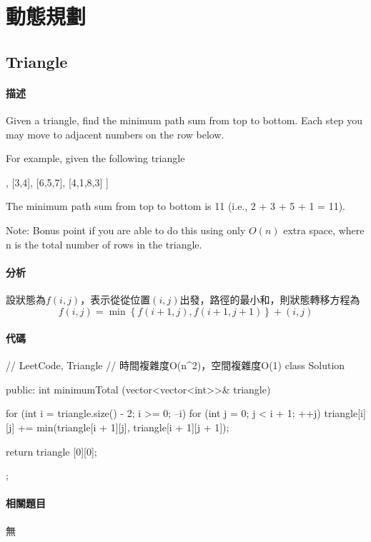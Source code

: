 \chapter{動態規劃}


\section{Triangle} %
\label{sec:triangle}


\subsubsection{描述}
Given a triangle, find the minimum path sum from top to bottom. Each step you may move to adjacent numbers on the row below.

For example, given the following triangle
\begin{Code}
[
     [2],
    [3,4],
   [6,5,7],
  [4,1,8,3]
]
\end{Code}
The minimum path sum from top to bottom is 11 (i.e., 2 + 3 + 5 + 1 = 11).

Note: Bonus point if you are able to do this using only $O(n)$ extra space, where n is the total number of rows in the triangle.


\subsubsection{分析}
設狀態為$f(i, j)$，表示從從位置$(i,j)$出發，路徑的最小和，則狀態轉移方程為
$$
f(i,j)=\min\left\{f(i+1,j),f(i+1,j+1)\right\}+(i,j)
$$


\subsubsection{代碼}
\begin{Code}
// LeetCode, Triangle
// 時間複雜度O(n^2)，空間複雜度O(1)
class Solution {
public:
    int minimumTotal (vector<vector<int>>& triangle) {
        for (int i = triangle.size() - 2; i >= 0; --i)
            for (int j = 0; j < i + 1; ++j)
                triangle[i][j] += min(triangle[i + 1][j],
                        triangle[i + 1][j + 1]);

        return triangle [0][0];
    }
};
\end{Code}


\subsubsection{相關題目}
\begindot
\item 無
\myenddot

